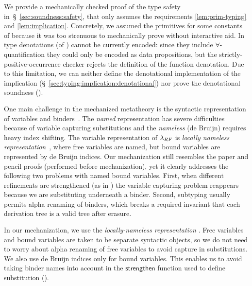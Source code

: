 We provide a mechanically checked
proof of the type safety in~\S~\ref{sec:soundness:safety}, 
that only assumes the requirements
\ref{lem:prim-typing} and \ref{lem:implication}. 
%
Concretely, we assumed the primitives  for some 
constants of \sysrf because 
it was too strenuous to mechanically prove 
without interactive aid. 
%
In \lh type denotations (of ) 
cannot be currently encoded: 
since they include $\forall$-quantification
they could only be encoded as data propositions, 
but the strictly-positive-occurrence checker 
rejects the definition of the function denotation. 
Due to this limitation, 
we can neither define the denotational implementation
of the implication (\S~\ref{sec:typing:implication:denotational})
nor prove 
the denotational soundness (). 


One main challenge in the mechanized
metatheory is the syntactic representation
of variables and binders~\cite{Aydemir05}.
%
The \emph{named} representation
has severe difficulties because
of variable capturing substitutions
and the \emph{nameless} (\aka de Bruijn)
requires heavy index shifting.
%
The variable representation
of $\lambda_{RF}$ is
\emph{locally nameless representation}~\cite{Pollack93,AydemirCPPW08},
where free variables are named, but
bound variables are represented by
de Bruijn indices.
%
Our mechanization still resembles
the paper and pencil proofs (performed
before  mechanization),
yet it clearly addresses
the following two problems with named bound variables.
%
First, when different refinements are strengthened
(as in ) the variable
capturing problem reappears
because we are substituting underneath a binder.
%
Second, subtyping usually permits
alpha-renaming of binders,
which breaks a required invariant
that each \sysrf derivation tree
is a valid \sysf tree after erasure. \\

\begin{fullversion}
%
In our mechanization, we use the
\emph{locally-nameless representation} \cite{AydemirCPPW08,Chargueraud12}.
%
Free variables and bound variables
are taken to be separate syntactic
objects, so we do not need to worry
about alpha renaming of free variables
to avoid capture in substitutions.
%
We also use de Bruijn indices only
for bound variables. This enables us to avoid
taking binder names into account in the
$\mathsf{strengthen}$ function used to define
substitution ().
%
%
\end{fullversion}

